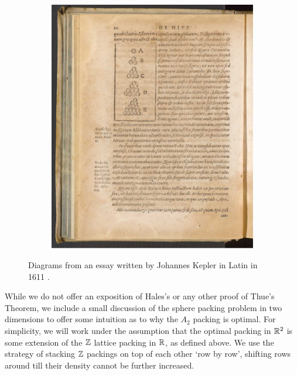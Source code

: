 \begin{figure}
\begin{subfigure}{\linewidth}
        \includegraphics[width=\linewidth]{Chapters/1_Intro/Images/Kepler_2.pdf}
        \caption{}
        \label{Ch1:Subfig:Kepler_Original_2}
    \end{subfigure}
    \caption{Diagrams from an essay written by Johannes Kepler in Latin in 1611 \cite{KeplerSnowflake}.}
\end{figure}

While we do not offer an exposition of Hales's or any other proof of Thue's Theorem, we include a small discussion of the sphere packing problem in two dimensions to offer some intuition as to why the $A_2$ packing is optimal. For simplicity, we will work under the assumption that the optimal packing in $\mathbb{R}^2$ is some extension of the $\mathbb{Z}$ lattice packing in $\mathbb{R}$, as defined above. We use the strategy of stacking $\mathbb{Z}$ packings on top of each other `row by row', shifting rows around till their density cannot be further increased.

